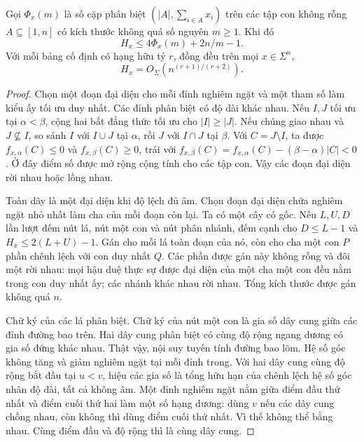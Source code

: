 \begin{lemma}\label{A-lem:rank}
Gọi $\Phi_x(m)$ là số cặp phân biệt $(|A|,\sum_{i\in A}x_i)$ trên các tập con không rỗng $A\subseteq[1,n]$ có kích thước không quá số nguyên $m\ge1$. Khi đó
\begin{equation}\label{A-eq:budget}
H_x\le4\Phi_x(m)+2n/m-1.
\end{equation}
Với mỗi bảng cố định có hạng hữu tỷ $r$, đồng đều trên mọi $x\in\Sigma^n$,
\begin{equation}\label{A-eq:rank}
H_x=O_\Sigma(n^{(r+1)/(r+2)}).
\end{equation}
\end{lemma}
\begin{proof}
Chọn một đoạn đại diện cho mỗi đỉnh nghiêm ngặt và một tham số làm kiểu ấy tối ưu duy nhất. Các đỉnh phân biệt có độ dài khác nhau. Nếu $I,J$ tối ưu tại $\alpha<\beta$, cộng hai bất đẳng thức tối ưu cho $|I|\ge|J|$. Nếu chúng giao nhau và $J\not\subseteq I$, so sánh $I$ với $I\cup J$ tại $\alpha$, rồi $J$ với $I\cap J$ tại $\beta$. Với $C=J\setminus I$, ta được $f_{x,\alpha}(C)\le0$ và $f_{x,\beta}(C)\ge0$, trái với $f_{x,\beta}(C)=f_{x,\alpha}(C)-(\beta-\alpha)|C|<0$. Ở đây điểm số được mở rộng cộng tính cho các tập con. Vậy các đoạn đại diện rời nhau hoặc lồng nhau.

Toàn dãy là một đại diện khi độ lệch đủ âm. Chọn đoạn đại diện chứa nghiêm ngặt nhỏ nhất làm cha của mỗi đoạn còn lại. Ta có một cây có gốc. Nếu $L,U,D$ lần lượt đếm nút lá, nút một con và nút phân nhánh, đếm cạnh cho $D\le L-1$ và $H_x\le2(L+U)-1$. Gán cho mỗi lá toàn đoạn của nó, còn cho cha một con $P$ phần chênh lệch với con duy nhất $Q$. Các phần được gán này không rỗng và đôi một rời nhau: mọi hậu duệ thực sự được đại diện của một cha một con đều nằm trong con duy nhất ấy; các nhánh khác nhau rời nhau. Tổng kích thước được gán không quá $n$.

Chữ ký của các lá phân biệt. Chữ ký của nút một con là gia số dây cung giữa các đỉnh đường bao trên. Hai dây cung phân biệt có cùng độ rộng ngang dương có gia số đứng khác nhau. Thật vậy, nội suy tuyến tính đường bao lõm. Hệ số góc không tăng và giảm nghiêm ngặt tại mỗi đỉnh trong. Với hai dây cung cùng độ rộng bắt đầu tại $u<v$, hiệu các gia số là tổng hữu hạn của chênh lệch hệ số góc nhân độ dài, tất cả không âm. Một đỉnh nghiêm ngặt nằm giữa điểm đầu thứ nhất và điểm cuối thứ hai làm một số hạng dương: dùng $v$ nếu các dây cung chồng nhau, còn không thì dùng điểm cuối thứ nhất. Vì thế không thể bằng nhau. Cùng điểm đầu và độ rộng thì là cùng dây cung.


\end{proof}
